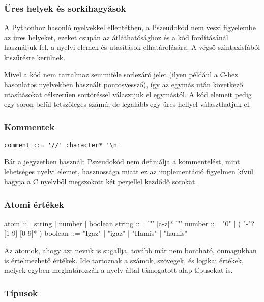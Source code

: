 \subsubsection{Üres helyek és sorkihagyások}

A Pythonhoz hasonló nyelvekkel ellentétben, a Pszeudokód nem veszi figyelembe az üres helyeket, ezeket csupán az átláthatósághoz és a kód fordításánál használjuk fel, a nyelvi elemek és utasítások elhatárolására. A végső szintaxisfából kiszűrésre kerülnek.

Mivel a kód nem tartalmaz semmiféle sorlezáró jelet (ilyen például a C-hez hasonlatos nyelvekben használt pontosvessző), így az egymás után következő utasításokat célszerűen sortöréssel választjuk el egymástól. A kód elemeit pedig egy soron belül tetszőleges számú, de legalább egy üres hellyel választhatjuk el.

\subsubsection{Kommentek}

\begin{footnotesize}
\begin{verbatim}
comment ::= '//' character* '\n'
\end{verbatim}
\end{footnotesize}

Bár a jegyzetben használt Pszeudokód nem definiálja a kommentelést, mint lehetséges nyelvi elemet, hasznossága miatt ez az implementáció figyelmen kívül hagyja a C nyelvből megszokott két perjellel kezdődő sorokat.

\subsubsection{Atomi értékek}

\begin{ebnf}
atom ::= string | number | boolean
string ::= '"' [a-z]* '"'
number ::= "0" | ( "-"? [1-9] [0-9]* )
boolean ::= "Igaz" | "igaz" | "Hamis" | "hamis"
\end{ebnf}

Az atomok, ahogy azt nevük is sugallja, tovább már nem bontható, önmagukban is értelmezhető értékek. Ide tartoznak a számok, szövegek, és logikai értékek, melyek egyben meghatározzák a nyelv által támogatott alap típusokat is.

\subsubsection{Típusok}


